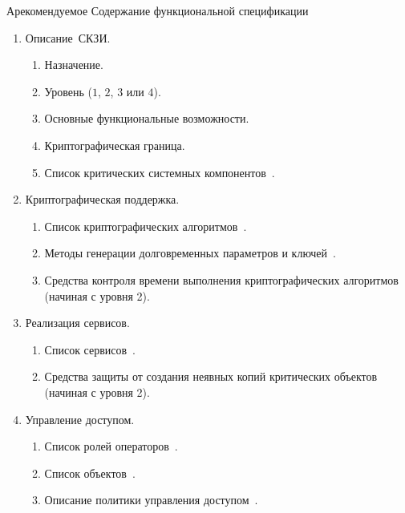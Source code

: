 \begin{appendix}{А}{рекомендуемое}
{Содержание функциональной спецификации}\label{SPEC}

\mbox{}

\begin{enumerate}
\item
{Описание~СКЗИ.}

\begin{enumerate}
\item
Назначение.
\item
Уровень ($1$, $2$, $3$ или $4$).
\item
Основные функциональные возможности.
\item
Криптографическая граница.
\item
Список критических системных компонентов~.
\end{enumerate}

\item
{Криптографическая поддержка.}

\begin{enumerate}
\item
Список криптографических алгоритмов~.

\item
Методы генерации долговременных параметров и ключей~.

\item
Средства контроля времени выполнения криптографических 
алгоритмов~ (начиная с уровня 2). 
\end{enumerate}

\item
{Реализация сервисов.}
\begin{enumerate}
\item
Список сервисов~.

\item
Средства защиты от создания неявных копий
критических объектов~ 
(начиная с уровня 2).
\end{enumerate}

\item
{Управление доступом.}

\begin{enumerate}
\item
Список ролей операторов~.

\item
Список объектов~.

\item
Описание политики управления доступом~.


\end{enumerate}
\end{enumerate}
\end{appendix}
